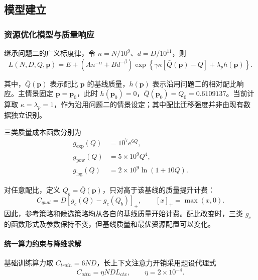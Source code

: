 \documentclass[bwprint]{gmcmthesis}
\numberwithin{equation}{section}
\numberwithin{figure}{section}
\numberwithin{table}{section}
\begin{document}
    \subsection{模型建立}

        \subsubsection{资源优化模型与质量响应}

        继承问题二的广义标度律，令 $n=N/10^9$、$d=D/10^{11}$，则
        \begin{equation}
        L(N,D,Q,\bm p)
        =E+\left(An^{-\alpha}+Bd^{-\beta}\right)
        \exp\left\{\gamma\kappa[\bar Q(\bm p)-Q]+\lambda_p h(\bm p)\right\}.
        \label{eq:p3_loss}
        \end{equation}

        其中，$\bar Q(\bm p)$ 表示配比 $\bm p$ 的基线质量，$h(\bm p)$ 表示沿用问题二的相对配比响应。主情景固定 $\bm p=\bm p_0$，此时 $h(\bm p_0)=0$，$\bar Q(\bm p_0)=Q_0=0.6109137$。当前计算取 $\kappa=\lambda_p=1$，作为沿用问题二的情景设定；其中配比迁移强度并非由现有数据独立识别。

        三类质量成本函数分别为
        \begin{equation}
        \begin{aligned}
        g_{\exp}(Q)&=10^7e^{6Q},\\
        g_{\mathrm{pow}}(Q)&=5\times10^9Q^4,\\
        g_{\log}(Q)&=2\times10^9\ln(1+10Q).
        \end{aligned}
        \label{eq:p3_quality_cost}
        \end{equation}

        对任意配比，定义 $Q_b=\bar Q(\bm p)$，只对高于该基线的质量提升计费：
        \begin{equation}
        C_{qual}=D[g_c(Q)-g_c(Q_b)]_+,
        \qquad [x]_+=\max(x,0).
        \label{eq:p3_quality_compute}
        \end{equation}
        因此，参考策略和候选策略均从各自的基线质量开始计费。配比改变时，三类 $g_c$ 的函数形式及参数保持不变，但基线质量和最优资源配置可以变化。

        \paragraph{统一算力约束与降维求解}

        基础训练算力取 $C_{train}=6ND$，长上下文注意力开销采用题设代理式
        \begin{equation}
        C_{attn}=\eta NDL_{ctx},
        \qquad \eta=2\times10^{-4}.
        \label{eq:p3_attention}
        \end{equation}
\end{document}
